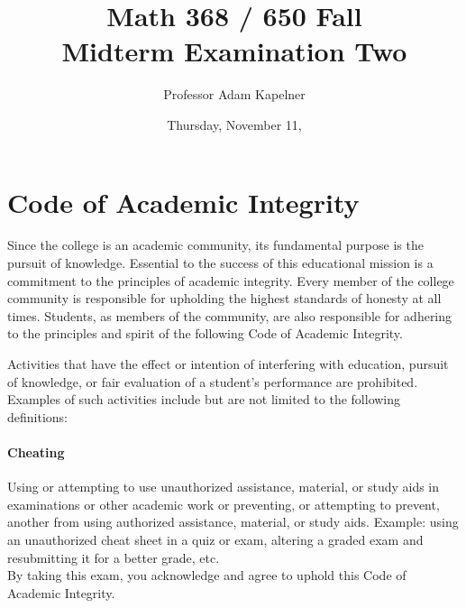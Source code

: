 \documentclass[12pt,landscape]{article}
\title{Math 368 / 650 Fall \the\year{} \\ Midterm Examination Two}
\author{Professor Adam Kapelner}
\date{Thursday, November 11, \the\year{}}
\begin{document}
\maketitle


\thispagestyle{empty}

\section*{Code of Academic Integrity}

\footnotesize
Since the college is an academic community, its fundamental purpose is the pursuit of knowledge. Essential to the success of this educational mission is a commitment to the principles of academic integrity. Every member of the college community is responsible for upholding the highest standards of honesty at all times. Students, as members of the community, are also responsible for adhering to the principles and spirit of the following Code of Academic Integrity.

Activities that have the effect or intention of interfering with education, pursuit of knowledge, or fair evaluation of a student's performance are prohibited. Examples of such activities include but are not limited to the following definitions:

\paragraph{Cheating} Using or attempting to use unauthorized assistance, material, or study aids in examinations or other academic work or preventing, or attempting to prevent, another from using authorized assistance, material, or study aids. Example: using an unauthorized cheat sheet in a quiz or exam, altering a graded exam and resubmitting it for a better grade, etc.
\\

\noindent By taking this exam, you acknowledge and agree to uphold this Code of Academic Integrity. \\


\normalsize
\end{document}
